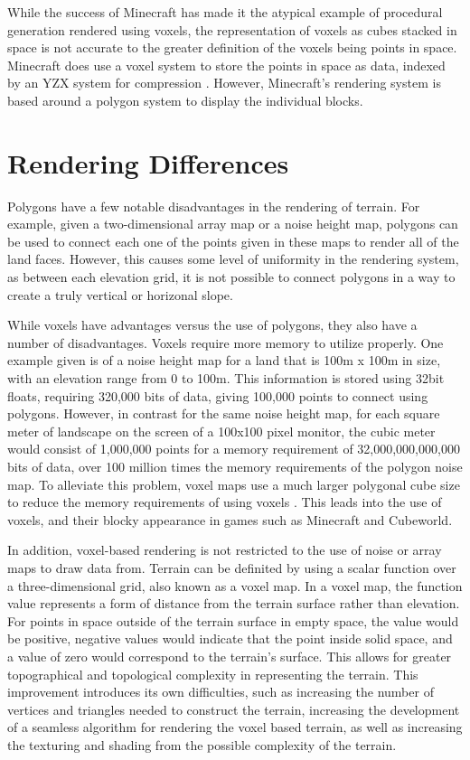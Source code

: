 \documentclass[10pt]{report}
\begin{document}
								While the success of Minecraft has made it the atypical example of procedural generation rendered using voxels, the representation of voxels as cubes stacked in space is not accurate to the greater definition of the voxels being points in space. Minecraft does use a voxel system to store the points in space as data, indexed by an YZX system for compression \cite{minecraft-voxel}. However, Minecraft's rendering system is based around a polygon system to display the individual blocks. 
		
		\section{Rendering Differences}
		
								Polygons have a few notable disadvantages in the rendering of terrain. For example, given a two-dimensional array map or a noise height map, polygons can be used to connect each one of the points given in these maps to render all of the land faces. However, this causes some level of uniformity in the rendering system, as between each elevation grid, it is not possible to connect polygons in a way to create a truly vertical or horizonal slope. 
								
								While voxels have advantages versus the use of polygons, they also have a number of disadvantages. Voxels require more memory to utilize properly. One example given is of a noise height map for a land that is 100m x 100m in size, with an elevation range from 0 to 100m. This information is stored using 32bit floats, requiring 320,000 bits of data, giving 100,000 points to connect using polygons. However, in contrast for the same noise height map, for each square meter of landscape on the screen of a 100x100 pixel monitor, the cubic meter would consist of 1,000,000 points for a memory requirement of 32,000,000,000,000 bits of data, over 100 million times the memory requirements of the polygon noise map. To alleviate this problem, voxel maps use a much larger polygonal cube size to reduce the memory requirements of using voxels \cite{high-level-voxel}. This leads into the use of voxels, and their blocky appearance in games such as Minecraft and Cubeworld.
								
								In addition, voxel-based rendering is not restricted to the use of noise or array maps to draw data from. Terrain can be definited by using a scalar function over a three-dimensional grid, also known as a voxel map. In a voxel map, the function value represents a form of distance from the terrain surface rather than elevation. For points in space outside of the terrain surface in empty space, the value would be positive, negative values would indicate that the point inside solid space, and a value of zero would correspond to the terrain's surface. This allows for greater topographical and topological complexity in representing the terrain. This improvement introduces its own difficulties, such as increasing the number of vertices and triangles needed to construct the terrain, increasing the development of a seamless algorithm for rendering the voxel based terrain, as well as increasing the texturing and shading from the possible complexity of the terrain. 
	
\end{document}
